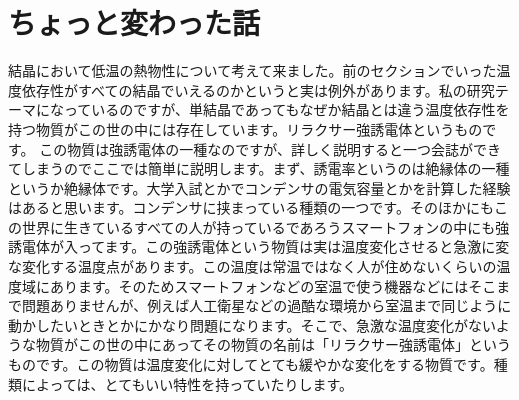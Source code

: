 \documentclass[10pt,b5paper,papersize,dvipdfmx]{jsbook}
\begin{document}
\section{ちょっと変わった話}
結晶において低温の熱物性について考えて来ました。前のセクションでいった温度依存性がすべての結晶でいえるのかというと実は例外があります。私の研究テーマになっているのですが、単結晶であってもなぜか結晶とは違う温度依存性を持つ物質がこの世の中には存在しています。リラクサー強誘電体というものです。
この物質は強誘電体の一種なのですが、詳しく説明すると一つ会誌ができてしまうのでここでは簡単に説明します。まず、誘電率というのは絶縁体の一種というか絶縁体です。大学入試とかでコンデンサの電気容量とかを計算した経験はあると思います。コンデンサに挟まっている種類の一つです。そのほかにもこの世界に生きているすべての人が持っているであろうスマートフォンの中にも強誘電体が入ってます。この強誘電体という物質は実は温度変化させると急激に変な変化する温度点があります。この温度は常温ではなく人が住めないくらいの温度域にあります。そのためスマートフォンなどの室温で使う機器などにはそこまで問題ありませんが、例えば人工衛星などの過酷な環境から室温まで同じように動かしたいときとかにかなり問題になります。そこで、急激な温度変化がないような物質がこの世の中にあってその物質の名前は「リラクサー強誘電体」というものです。この物質は温度変化に対してとても緩やかな変化をする物質です。種類によっては、とてもいい特性を持っていたりします。
\end{document}
